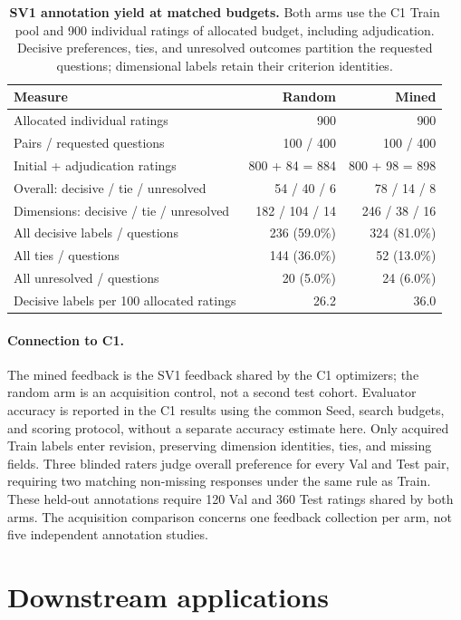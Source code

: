 \begin{table}[!htbp]
\caption{\textbf{SV1 annotation yield at matched budgets.}
Both arms use the C1 Train pool and 900 individual ratings of allocated budget, including adjudication.
Decisive preferences, ties, and unresolved outcomes partition the requested questions; dimensional labels retain their criterion identities.}
\label{tab:slide-pilot}
\centering\small
\begin{tabularx}{\linewidth}{@{}Yrr@{}}
\toprule
Measure & Random & Mined\\
\midrule
Allocated individual ratings & 900 & 900\\
Pairs / requested questions & 100 / 400 & 100 / 400\\
Initial + adjudication ratings & 800 + 84 = 884 & 800 + 98 = 898\\
Overall: decisive / tie / unresolved & 54 / 40 / 6 & 78 / 14 / 8\\
Dimensions: decisive / tie / unresolved & 182 / 104 / 14 & 246 / 38 / 16\\
All decisive labels / questions & 236 (59.0\%) & 324 (81.0\%)\\
All ties / questions & 144 (36.0\%) & 52 (13.0\%)\\
All unresolved / questions & 20 (5.0\%) & 24 (6.0\%)\\
Decisive labels per 100 allocated ratings & 26.2 & 36.0\\
\bottomrule
\end{tabularx}
\end{table}

\paragraph{Connection to C1.}
The mined feedback is the SV1 feedback shared by the C1 optimizers; the random arm is an acquisition control, not a second test cohort.
Evaluator accuracy is reported in the C1 results using the common Seed, search budgets, and scoring protocol, without a separate accuracy estimate here.
Only acquired Train labels enter revision, preserving dimension identities, ties, and missing fields.
Three blinded raters judge overall preference for every Val and Test pair, requiring two matching non-missing responses under the same rule as Train.
These held-out annotations require 120 Val and 360 Test ratings shared by both arms.
The acquisition comparison concerns one feedback collection per arm, not five independent annotation studies.

\section{Downstream applications}
\label{app:downstream}
